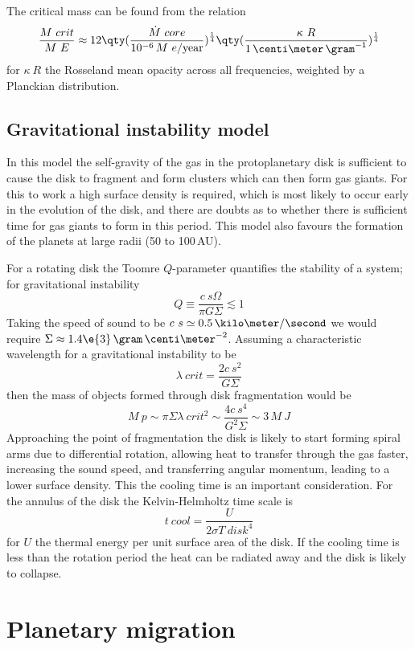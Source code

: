 The critical mass can be found from the relation
\begin{equation}
  \label{eq:50}
  \frac{M~{crit}}{M~E} \approx 12 \qty( \frac{\dot{M}~{core}}{10^{-6}\,M~e/\text{year}} )^{\frac{1}{4}} \qty( \frac{\kappa~R}{1\,\centi\meter\,\gram^{-1}} )^{\frac{1}{4}}
\end{equation}
for $\kappa~R$ the Rosseland mean opacity across all frequencies,
weighted by a Planckian distribution.

\subsection{Gravitational instability model}
\label{sec:grav-inst-model}

In this model the self-gravity of the gas in the protoplanetary disk
is sufficient to cause the disk to fragment and form clusters which
can then form gas giants. For this to work a high surface density is
required, which is most likely to occur early in the evolution of the
disk, and there are doubts as to whether there is sufficient time for
gas giants to form in this period. This model also favours the
formation of the planets at large radii (50 to 100\,AU).

For a rotating disk the Toomre $Q$-parameter quantifies the stability
of a system; for gravitational instability 
\[ Q \equiv \frac{c~s \Omega}{\pi G \Sigma} \lesssim 1 \] Taking the
speed of sound to be $c~s \simeq 0.5\,\kilo\meter/\second$ we would
require $\Sigma \approx 1.4\e{3}\,\gram\,\centi\meter^{-2}$. Assuming
a characteristic wavelength for a gravitational instability to be
\[ \lambda~{crit} = \frac{2 c~s^2}{G \Sigma} \]
then the mass of objects formed through disk fragmentation would be 
\[ M~p \sim \pi \Sigma \lambda~{crit}^2 \sim \frac{4 c~s^4}{G^2
  \Sigma} \sim 3\,M~J \] Approaching the point of fragmentation the
disk is likely to start forming spiral arms due to differential
rotation, allowing heat to transfer through the gas faster, increasing
the sound speed, and transferring angular momentum, leading to a lower
surface density. This the cooling time is an important
consideration. For the annulus of the disk the Kelvin-Helmholtz time
scale is
\[ t~{cool} = \frac{U}{2 \sigma T~{disk}^4} \] for $U$ the thermal
energy per unit surface area of the disk. If the cooling time is less
than the rotation period the heat can be radiated away and the disk is
likely to collapse.

\section{Planetary migration}
\label{sec:planetary-migration}

